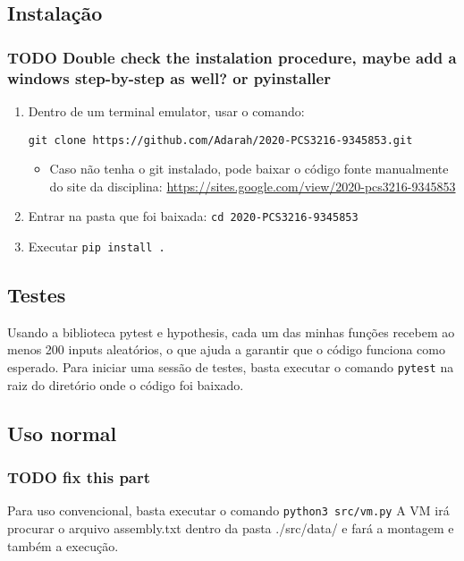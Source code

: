 \documentclass[11pt]{article}
\begin{document}
\subsection{Instalação}
\label{sec:orgbcd2479}
\subsubsection{{\bfseries\sffamily TODO} Double check the instalation procedure, maybe add a windows step-by-step as well? or pyinstaller}
\label{sec:org10459c1}

\begin{enumerate}
\item Dentro de um terminal emulator, usar o comando:

\texttt{git clone https://github.com/Adarah/2020-PCS3216-9345853.git}
\begin{itemize}
\item Caso não tenha o git instalado, pode baixar o código fonte manualmente do site da disciplina:
\url{https://sites.google.com/view/2020-pcs3216-9345853}
\end{itemize}
\item Entrar na pasta que foi baixada: \texttt{cd 2020-PCS3216-9345853}
\item Executar \texttt{pip install .}
\end{enumerate}
\subsection{Testes}
\label{sec:org866a0ea}
Usando a biblioteca pytest e hypothesis, cada um das minhas funções recebem ao
menos 200 inputs aleatórios, o que ajuda a garantir que o código funciona como
esperado. Para iniciar uma sessão de testes, basta executar o comando \texttt{pytest}
na raiz do diretório onde o código foi baixado.
\subsection{Uso normal}
\label{sec:org4303a29}
\subsubsection{{\bfseries\sffamily TODO} fix this part}
\label{sec:org65b5d2c}
Para uso convencional, basta executar o comando
\texttt{python3 src/vm.py}
A VM irá procurar o arquivo assembly.txt dentro da pasta ./src/data/ e fará a montagem e também a execução.
\end{document}
